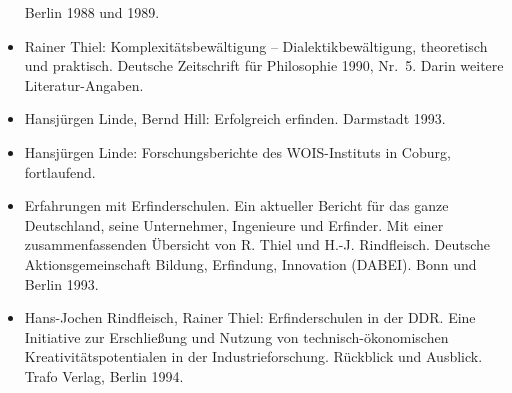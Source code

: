 \documentclass[12pt,a4paper]{article}
\begin{document}
\begin{itemize}
  Berlin 1988 und 1989.
\item Rainer Thiel: Komplexitätsbewältigung – Dialektikbewältigung, theoretisch
  und \linebreak praktisch.  Deutsche Zeitschrift für Philosophie 1990,
  Nr.~5. Darin weitere Literatur-Angaben.
\item Hansjürgen Linde, Bernd Hill: Erfolgreich erfinden. Darmstadt 1993.
\item Hansjürgen Linde: Forschungsberichte des WOIS-Instituts in Coburg,
  fortlaufend.
\item Erfahrungen mit Erfinderschulen. Ein aktueller Bericht für das ganze
  Deutschland, seine Unternehmer, Ingenieure und Erfinder. Mit einer
  zusammenfassenden Übersicht von R. Thiel und H.-J. Rindfleisch.  Deutsche
  Aktionsgemeinschaft Bildung, Erfindung, Innovation (DABEI).  Bonn und Berlin
  1993.
\item Hans-Jochen Rindfleisch, Rainer Thiel: Erfinderschulen in der DDR. Eine
  Initiative zur Erschließung und Nutzung von technisch-ökonomischen
  Kreativitätspotentialen in der Industrieforschung. Rückblick und Ausblick.
  Trafo Verlag, Berlin 1994.
\end{itemize}
\ccnotice
\end{document}
